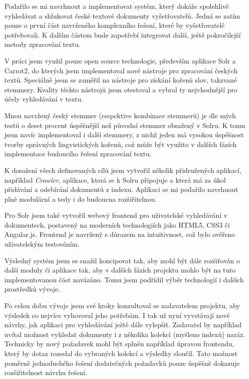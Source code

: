 \begin{conclusion}
Podařilo se mi navrhnout a implementovat systém, který dokáže spolehlivě vyhledávat a shlukovat české textové dokumenty vyšetřovatelů. Jedná se zatím pouze o první část navrženého komplexního řešení, které by vyšetřovatelé potřebovali. K dalším částem bude zapotřebí integrovat další, ještě pokročilejší metody zpracování textu.

V práci jsem využil pouze open source technologie, především aplikace Solr a Carrot2, do kterých jsem implementoval nové nástroje pro zpracování českých textů. Speciálně jsem se zaměřil na nástroje pro získání kořenů slov, takzvané stemmery. Kvality těchto nástrojů jsem otestoval a vybral ty nejvhodnější pro účely vyhledávání v textu. 

Mnou navržený český stemmer (respektive kombinace stemmerů) je dle mých testů o deset procent úspěšnější než původní stemmer obsažený v Solru. K tomu jsem navíc implementoval i další stemmery, z nichž jeden má vysokou úspěšnost tvorby správných lingvistických kořenů, což může být využito v dalších fázích implementace budoucího řešení zpracování textu.

K dosažení všech definovaných cílů jsem vytvořil několik přidružených aplikací, například \emph{Crawler}, aplikace, která se k Solru připojuje a která má za úkol přidávání a odebírání dokumentů z indexu. Aplikaci se mi podařilo navrhnout plně modulární a tedy i do budoucna rozšiřitelnou.

Pro Solr jsem také vytvořil webový frontend pro uživatelské vyhledávání v dokumentech, postavený na moderních technologiích jako HTML5, CSS3 či Angular.js. Frontend je navržený s důrazem na intuitivnost, což bylo ověřeno uživatelským testováním.

Výsledný systém jsem se snažil koncipovat tak, aby mohl být dále rozšiřován o další moduly či aplikace tak, aby v dalších fázích projektu mohlo být na tuto implementovanou část navázáno. Tomu jsem podřídil výběr technologií i dalších prostředků vývoje.

Po celou dobu vývoje jsem své kroky konzultoval se zadavatelem projektu, aby výsledek co nejvíce vyhovoval jeho potřebám. I tak už nyní vyvstávají nové návrhy, jak aplikaci pro vyhledávání ještě dále vylepšit. Zadavatel by například uvítal možnost vyhledat dokumenty i z několika kolekcí (myšleno indexů) naráz. Technicky by nový požadavek mohl být splněn například úpravou frontendu, který by dotaz rozeslal do vybraných kolekcí a výsledky sloučil. Tato možnost poměrně jednoduchého řešení dodatečných požadavků pouze úspěšně dokazuje rozšiřitelnost návrhu řešení.
\end{conclusion}